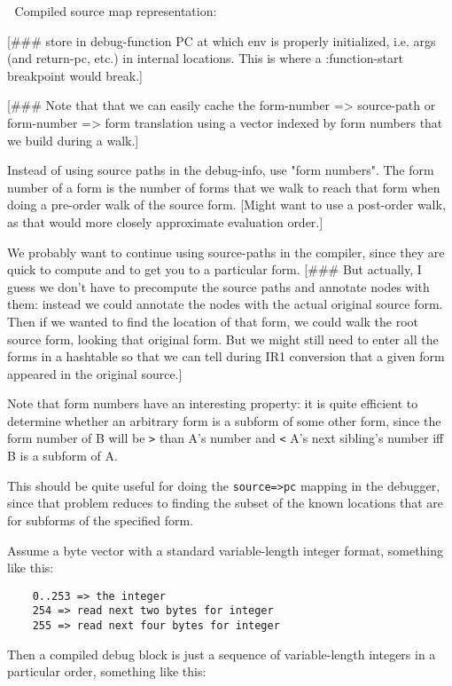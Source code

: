 
Compiled source map representation:

[\#\#\# store in debug-function PC at which env is properly initialized, i.e.
args (and return-pc, etc.) in internal locations.  This is where a
:function-start breakpoint would break.]

[\#\#\# Note that that we can easily cache the form-number => source-path or
form-number => form translation using a vector indexed by form numbers that we
build during a walk.]




Instead of using source paths in the debug-info, use "form numbers".  The form
number of a form is the number of forms that we walk to reach that form when
doing a pre-order walk of the source form.  [Might want to use a post-order
walk, as that would more closely approximate evaluation order.]


We probably want to continue using source-paths in the compiler, since they are
quick to compute and to get you to a particular form.  [\#\#\# But actually, I
guess we don't have to precompute the source paths and annotate nodes with
them: instead we could annotate the nodes with the actual original source form.
Then if we wanted to find the location of that form, we could walk the root
source form, looking that original form.  But we might still need to enter all
the forms in a hashtable so that we can tell during IR1 conversion that a given
form appeared in the original source.]


Note that form numbers have an interesting property: it is quite efficient to
determine whether an arbitrary form is a subform of some other form, since the
form number of B will be \verb+>+ than A's number and \verb+<+ A's next sibling's number iff
B is a subform of A.  

This should be quite useful for doing the \verb|source=>pc| mapping in the debugger,
since that problem reduces to finding the subset of the known locations that
are for subforms of the specified form.


Assume a byte vector with a standard variable-length integer format, something
like this:

\begin{verbatim}
    0..253 => the integer
    254 => read next two bytes for integer
    255 => read next four bytes for integer
\end{verbatim}

Then a compiled debug block is just a sequence of variable-length integers in a
particular order, something like this:


